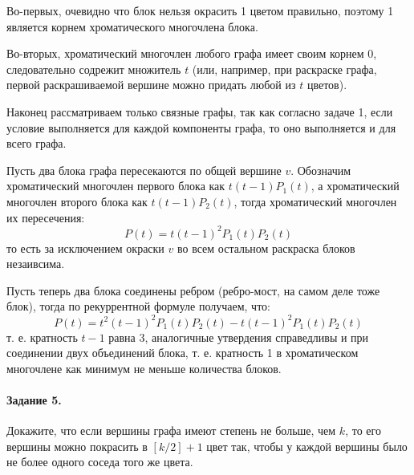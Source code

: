 \documentclass[a4paper,12pt]{article}
\begin{document}
\begin{Solution}
Во-первых, очевидно что блок нельзя окрасить 1 цветом правильно, поэтому 1 является корнем хроматического многочлена блока.

Во-вторых, хроматический многочлен любого графа имеет своим корнем 0, следовательно содрежит множитель $t$ (или, например, при раскраске графа, первой раскрашиваемой вершине можно придать любой из $t$ цветов).

Наконец рассматриваем только связные графы, так как согласно задаче 1, если условие выполняется для каждой компоненты графа, то оно выполняется и для всего графа.

Пусть два блока графа пересекаются по общей вершине $v$. Обозначим хроматический многочлен первого блока как $t \left(t-1\right) P_1\left(t\right)$, а хроматический многочлен второго блока как $t \left(t-1\right) P_2\left(t\right)$, тогда хроматический многочлен их пересечения:
\[
	P\left(t\right) = t \left(t-1\right)^2 P_1\left(t\right) P_2\left(t\right)
\]
то есть за исключением окраски $v$ во всем остальном раскраска блоков незаивсима.

Пусть теперь два блока соединены ребром (ребро-мост, на самом деле тоже блок), тогда по рекуррентной формуле получаем, что:
\[
	P\left(t\right) = t^2\left(t-1\right)^2P_1\left(t\right) P_2\left(t\right) - t \left(t-1\right)^2 P_1\left(t\right) P_2\left(t\right)
\]
т. е. кратность $t-1$ равна 3, аналогичные утвердения справедливы и при соединении двух объединений блока, т. е. кратность 1 в хроматическом многочлене как минимум не меньше количества блоков.
\end{Solution}

\paragraph{Задание 5.} Докажите, что если вершины графа имеют степень не больше, чем $k$, то его вершины можно покрасить в $\left[k/2\right]+1$ цвет так, чтобы у каждой вершины было не более одного соседа того же цвета.
\end{document}
